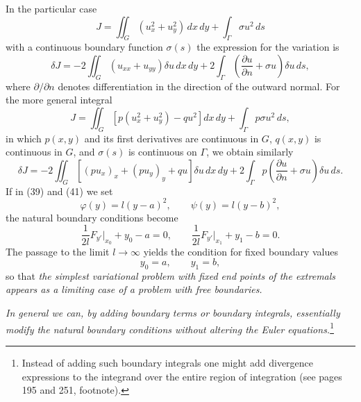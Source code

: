 In the particular case
\begin{equation}\tag{44}
J=\iint_G(u_x^2+u_y^2)\,dx\,dy+\int_\Gamma\sigma u^2\,ds
\end{equation}
with a continuous boundary function $\sigma(s)$ the expression for the variation is
\begin{equation}\tag{45}
\delta J=-2\iint_G(u_{xx}+u_{yy})\delta u\,dx\,dy
+2\int_\Gamma\left(\frac{\partial u}{\partial n}+\sigma u\right)\delta u\,ds,
\end{equation}
where $\partial/\partial n$ denotes differentiation in the direction of the outward normal. For the more general integral
\begin{equation}\tag{44'}
J=\iint_G[p(u_x^2+u_y^2)-qu^2]dx\,dy+\int_\Gamma p\sigma u^2\,ds,
\end{equation}
in which $p(x,y)$ and its first derivatives are continuous in $G$, $q(x,y)$ is continuous in $G$, and $\sigma(s)$ is continuous on $\Gamma$, we obtain similarly
\begin{equation}\tag{45'}
\delta J=-2\iint_G[(pu_x)_x+(pu_y)_y+qu]\delta u\,dx\,dy
+2\int_\Gamma p\left(\frac{\partial u}{\partial n}+\sigma u\right)\delta u\,ds.
\end{equation}
If in (39) and (41) we set
\[
\varphi(y)=l(y-a)^2,\qquad \psi(y)=l(y-b)^2,
\]
the natural boundary conditions become
\[
\frac{1}{2l}F_{y'}\big|_{x_0}+y_0-a=0,
\qquad
\frac{1}{2l}F_{y'}\big|_{x_1}+y_1-b=0.
\]
The passage to the limit $l\to\infty$ yields the condition for fixed boundary values
\[
y_0=a,\qquad y_1=b,
\]
so that \emph{the simplest variational problem with fixed end points of the extremals appears as a limiting case of a problem with free boundaries.}

\emph{In general we can, by adding boundary terms or boundary integrals, essentially modify the natural boundary conditions without altering the Euler equations.}\footnote{Instead of adding such boundary integrals one might add divergence expressions to the integrand over the entire region of integration (see pages 195 and 251, footnote).}


